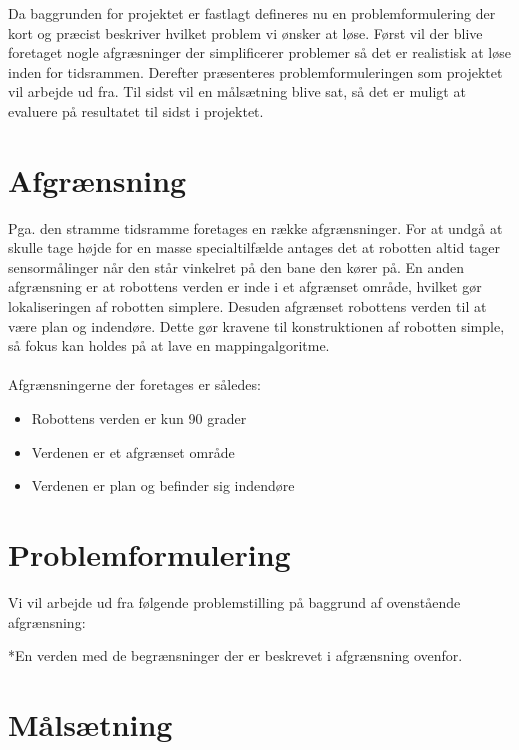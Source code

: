 Da baggrunden for projektet er fastlagt defineres nu en problemformulering der kort og præcist beskriver hvilket problem vi ønsker at løse.
Først vil der blive foretaget nogle afgræsninger der simplificerer problemer så det er realistisk at løse inden for tidsrammen.
Derefter præsenteres problemformuleringen som projektet vil arbejde ud fra.
Til sidst vil en målsætning blive sat, så det er muligt at evaluere på resultatet til sidst i projektet.

\section*{Afgrænsning}
Pga. den stramme tidsramme foretages en række afgrænsninger.
For at undgå at skulle tage højde for en masse specialtilfælde antages det at robotten altid tager sensormålinger når den står vinkelret på den bane den kører på. 
En anden afgrænsning er at robottens verden er inde i et afgrænset område, hvilket gør lokaliseringen af robotten simplere.
Desuden afgrænset robottens verden til at være plan og indendøre. 
Dette gør kravene til konstruktionen af robotten simple, så fokus kan holdes på at lave en mappingalgoritme.

\paragraph{}
 Afgrænsningerne der foretages er således:
\begin{itemize}
\item Robottens verden er kun 90 grader
\item Verdenen er et afgrænset område
\item Verdenen er plan og befinder sig indendøre
\end{itemize}

\section*{Problemformulering}\label{problemformulering}
Vi vil arbejde ud fra følgende problemstilling på baggrund af ovenstående afgrænsning:

\begin{samepage}


\end{samepage}
*En verden med de begrænsninger der er beskrevet i afgrænsning ovenfor.

\section*{Målsætning}
